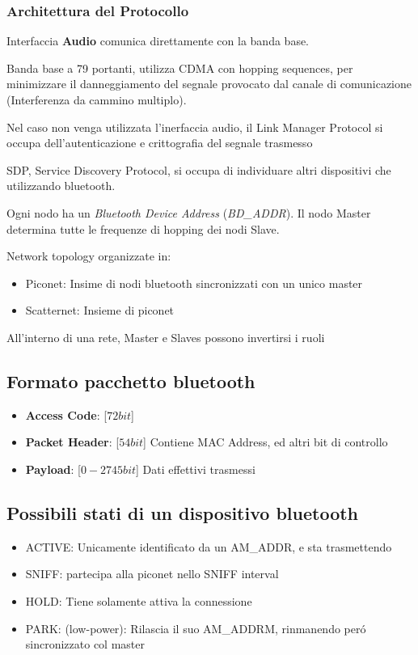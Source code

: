 \documentclass{article}
\begin{document}
\subsubsection{Architettura del Protocollo}
Interfaccia \textbf{Audio} comunica direttamente con la banda base.

Banda base a 79 portanti, utilizza CDMA con hopping sequences, per minimizzare il danneggiamento del segnale provocato dal canale di comunicazione (Interferenza da cammino multiplo).

Nel caso non venga utilizzata l'inerfaccia audio, il Link Manager Protocol si occupa dell'autenticazione e crittografia del segnale trasmesso

SDP, Service Discovery Protocol, si occupa di individuare altri dispositivi che utilizzando bluetooth.

Ogni nodo ha un \textit{Bluetooth Device Address} (\textit{BD\_ADDR}). Il nodo Master determina tutte le frequenze di hopping dei nodi Slave.

Network topology organizzate in:
\begin{itemize}
    \item Piconet: Insime di nodi bluetooth sincronizzati con un unico master
    \item Scatternet: Insieme di piconet
\end{itemize}

All'interno di una rete, Master e Slaves possono invertirsi i ruoli

\subsection{Formato pacchetto bluetooth}
\begin{itemize}
    \item \textbf{Access Code}: [$72 bit$]
    \item \textbf{Packet Header}: [$54 bit$] Contiene MAC Address, ed altri bit di controllo
    \item \textbf{Payload}: [$0-2745 bit$] Dati effettivi trasmessi
\end{itemize}

\subsection{Possibili stati di un dispositivo bluetooth}
\begin{itemize}
    \item ACTIVE:  Unicamente identificato da un AM\_ADDR, e sta trasmettendo
    \item SNIFF: partecipa alla piconet nello SNIFF interval
    \item HOLD: Tiene solamente attiva la connessione
    \item PARK: (low-power): Rilascia il suo AM\_ADDRM, rinmanendo per\'o sincronizzato col master
\end{itemize}
\end{document}
